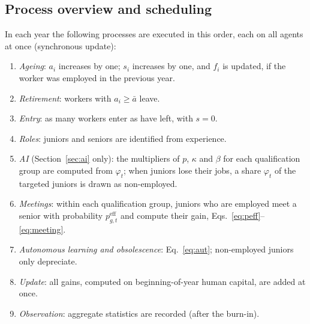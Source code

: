 \documentclass[preprint,12pt,authoryear]{elsarticle}
\begin{document}
\subsection{Process overview and scheduling}
In each year the following processes are executed in this order, each on all agents at once (synchronous update):
\begin{enumerate}
\item \emph{Ageing}: $a_i$ increases by one; $s_i$ increases by one, and $f_i$ is updated, if the worker was employed in the previous year.
\item \emph{Retirement}: workers with $a_i\ge\bar a$ leave.
\item \emph{Entry}: as many workers enter as have left, with $s=0$.
\item \emph{Roles}: juniors and seniors are identified from experience.
\item \emph{AI} (Section~\ref{sec:ai} only): the multipliers of $p$, $\kappa$ and $\beta$ for each qualification group are computed from $\varphi_t$; when juniors lose their jobs, a share $\varphi_t$ of the targeted juniors is drawn as non-employed.
\item \emph{Meetings}: within each qualification group, juniors who are employed meet a senior with probability $p^{\mathrm{eff}}_{g,t}$ and compute their gain, Eqs.~\eqref{eq:peff}--\eqref{eq:meeting}.
\item \emph{Autonomous learning and obsolescence}: Eq.~\eqref{eq:aut}; non-employed juniors only depreciate.
\item \emph{Update}: all gains, computed on beginning-of-year human capital, are added at once.
\item \emph{Observation}: aggregate statistics are recorded (after the burn-in).
\end{enumerate}
\end{document}
